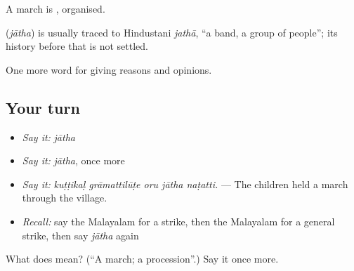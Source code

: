 A march is , organised.

\begin{cousinweb}
\textbf{} (\emph{jātha}) is usually traced to Hindustani \emph{jathā}, \textquotedblleft{}a band, a group of people\textquotedblright{}; its history before that is not settled.
\end{cousinweb}

\begin{grammarlens}[title={What you've built}]
One more word for giving reasons and opinions.
\end{grammarlens}

\subsection*{Your turn}
\begin{itemize}
\raggedright
  \item \emph{Say it:} \emph{jātha}
  \item \emph{Say it:} \emph{jātha}, once more
  \item \emph{Say it:} \emph{kuṭṭikaḷ grāmattilūṭe oru jātha naṭatti.} — The children held a march through the village.
  \item \emph{Recall:} say the Malayalam for a strike, then the Malayalam for a general strike, then say \emph{jātha} again
\end{itemize}

\begin{tcolorbox}[breakable,colback=teal!4,colframe=teal!35!black,title={Before you move on}]
What does  mean? (\textquotedblleft{}A march; a procession\textquotedblright{}.) Say it once more.
\end{tcolorbox}
